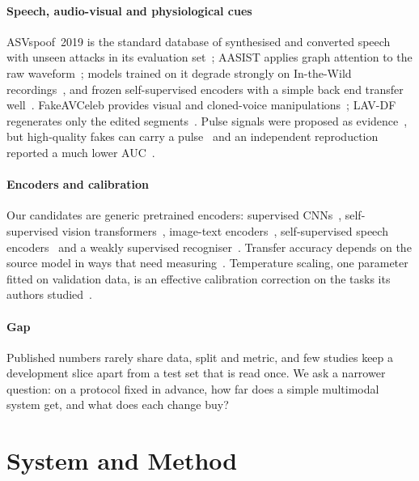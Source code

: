 \documentclass[conference,a4paper]{IEEEtran_nodash}
\begin{document}
\paragraph*{Speech, audio-visual and physiological cues}
ASVspoof~2019 is the standard database of synthesised and converted speech with
unseen attacks in its evaluation set~\cite{wang2020asvspoof}; AASIST applies graph
attention to the raw waveform~\cite{jung2021aasist}; models trained on it degrade
strongly on In-the-Wild recordings~\cite{muller2022inthewild}, and frozen
self-supervised encoders with a simple back end transfer
well~\cite{pascu2024generalisable}. FakeAVCeleb provides visual and cloned-voice
manipulations~\cite{khalid2022fakeavceleb}; LAV-DF regenerates only the edited
segments~\cite{cai2022lavdf}. Pulse signals were proposed as
evidence~\cite{ciftci2020fakecatcher}, but high-quality fakes can carry a
pulse~\cite{seibold2025heart} and an independent reproduction reported a much
lower AUC~\cite{harraq2026physio}.

\paragraph*{Encoders and calibration}
Our candidates are generic pretrained encoders: supervised
CNNs~\cite{chollet2017xception,tan2019efficientnet}, self-supervised vision
transformers~\cite{oquab2024dinov2}, image-text
encoders~\cite{radford2021clip,zhai2023siglip}, self-supervised speech
encoders~\cite{baevski2020wav2vec2,hsu2021hubert,chen2022wavlm} and a weakly
supervised recogniser~\cite{radford2023whisper}. Transfer accuracy depends on the
source model in ways that need measuring~\cite{kornblith2019better}. Temperature
scaling, one parameter fitted on validation data, is an effective calibration
correction on the tasks its authors studied~\cite{guo2017calibration}.

\paragraph*{Gap}
Published numbers rarely share data, split and metric, and few studies keep a
development slice apart from a test set that is read once. We ask a narrower
question: on a protocol fixed in advance, how far does a simple multimodal system
get, and what does each change buy?

\section{System and Method}\label{sec:method}
\end{document}
